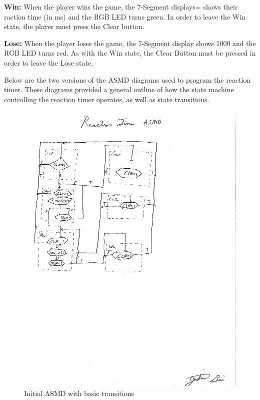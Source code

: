 \documentclass{article}
\begin{document}
\smallskip
\textbf{Win: }When the player wins the game, the 7-Segment displays= shows their raction time (in ms) and the RGB LED turns green. In order to leave the Win state, the player must press the Clear button.

\smallskip
\textbf{Lose: }When the player loses the game, the 7-Segment display shows 1000 and the RGB LED turns red. As with the Win state, the Clear Button must be pressed in order to leave the Lose state.

\bigskip
Below are the two versions of the ASMD diagrams used to program the reaction timer. These diagrams provided a general outline of how the state machine controlling the reaction timer operates, as well as state transitions. 

\begin{figure}
	\includegraphics[width=.9\linewidth]{pdfs/reaction_timer_asmd.pdf}
	\caption{Initial ASMD with basic transitions}
	\label{fig:ASMD1}
\end{figure}
\end{document}
